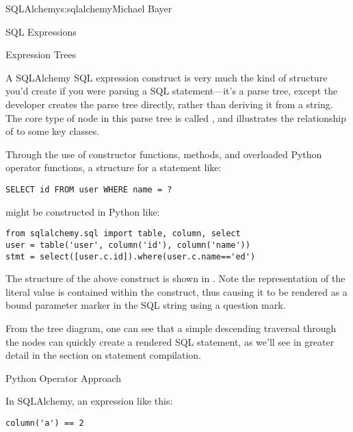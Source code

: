 \begin{aosachapter}{SQLAlchemy}{s:sqlalchemy}{Michael Bayer}
\begin{aosasect1}{SQL Expressions}
\begin{aosasect2}{Expression Trees}

A SQLAlchemy SQL expression construct is very much the kind of structure
you'd create if you were parsing a SQL statement---it's a parse tree,
except the developer creates the parse tree directly, rather than
deriving it from a string.   The core type of node in this parse
tree is called , and  illustrates the relationship
of  to some key classes.


Through the use of constructor functions, methods, and overloaded Python
operator functions, a structure for a statement like:

\begin{verbatim}
SELECT id FROM user WHERE name = ?
\end{verbatim}

might be constructed in Python like:

\begin{verbatim}
from sqlalchemy.sql import table, column, select
user = table('user', column('id'), column('name'))
stmt = select([user.c.id]).where(user.c.name=='ed')
\end{verbatim}

The structure of the above  construct is shown in .
Note the representation of the literal value  is contained
within the  construct, thus causing it to be rendered
as a bound parameter marker in the SQL string using a question mark.


From the tree diagram, one can see that a simple descending traversal through
the nodes can quickly create a rendered SQL statement, as we'll see in greater
detail in the section on statement compilation.

\end{aosasect2}

\begin{aosasect2}{Python Operator Approach}

In SQLAlchemy, an expression like this:

\begin{verbatim}
column('a') == 2
\end{verbatim}


\end{aosasect2}
\end{aosasect1}
\end{aosachapter}
